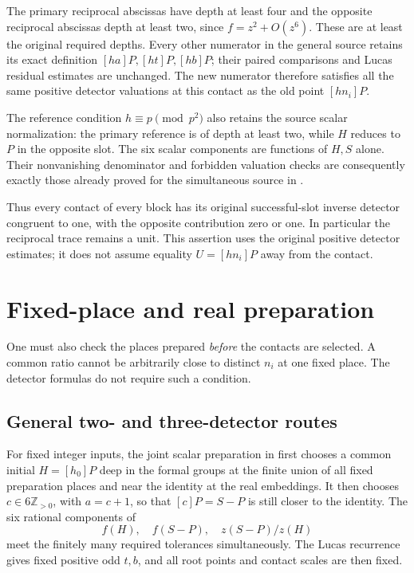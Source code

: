 \documentclass[11pt]{article}
\newcommand{\Z}{\mathbb Z}
\begin{document}
The primary reciprocal abscissas have depth at least four and
the opposite reciprocal abscissas depth at least two, since
\(f=z^2+O(z^6)\). These are at least the original required
depths. Every other numerator in the general source retains
its exact definition \([ha]P,[ht]P,[hb]P\); their paired
comparisons and Lucas residual estimates are unchanged.
The new numerator therefore satisfies all the same positive
detector valuations at this contact as the old point
\([hn_i]P\).

The reference condition \(h\equiv p\pmod {p^2}\) also retains
the source scalar normalization: the primary reference is
of depth at least two, while \(H\) reduces to \(P\) in the
opposite slot. The six scalar components are functions of
\(H,S\) alone. Their nonvanishing denominator and forbidden
valuation checks are consequently exactly those already proved
for the simultaneous source in \cite{shared}.

Thus every contact of every block has its original successful-slot
inverse detector congruent to one, with the opposite contribution
zero or one. In particular the reciprocal trace remains a unit.
This assertion uses the original positive detector estimates;
it does not assume equality \(U=[hn_i]P\) away from the contact.

\section{Fixed-place and real preparation}
\label{sec:fixed}

One must also check the places prepared \emph{before} the contacts
are selected. A common ratio cannot be arbitrarily close to
distinct \(n_i\) at one fixed place. The detector formulas
do not require such a condition.

\subsection{General two- and three-detector routes}

For fixed integer inputs, the joint scalar preparation in
\cite{shared} first chooses a common initial \(H=[h_0]P\)
deep in the formal groups at the finite union of all fixed
preparation places and near the identity at the real embeddings.
It then chooses \(c\in6\Z_{>0}\), with \(a=c+1\), so that
\([c]P=S-P\) is still closer to the identity. The six rational
components of
\[
                       f(H),\quad f(S-P),\quad z(S-P)/z(H)
\]
meet the finitely many required tolerances simultaneously.
The Lucas recurrence gives fixed positive odd \(t,b\), and
all root points and contact scales are then fixed.
\end{document}
